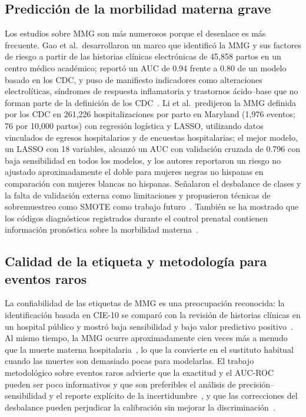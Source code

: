 \documentclass[healthcare,article,submit,pdftex,moreauthors]{Definitions/mdpi_es}
\begin{document}
\subsection{Predicción de la morbilidad materna grave}
Los estudios sobre MMG son más numerosos porque el desenlace es más frecuente. Gao et al.\
desarrollaron un marco que identificó la MMG y sus factores de riesgo a partir de las
historias clínicas electrónicas de 45{,}858 partos en un centro médico académico; reportó un
AUC de 0.94 frente a 0.80 de un modelo basado en los CDC, y puso de manifiesto indicadores
como alteraciones electrolíticas, síndromes de respuesta inflamatoria y trastornos
ácido--base que no forman parte de la definición de los CDC~\cite{Gao2019SMM}. Li et al.\
predijeron la MMG definida por los CDC en 261{,}226 hospitalizaciones por parto en Maryland
(1{,}976 eventos; 76 por 10{,}000 partos) con regresión logística y LASSO, utilizando datos
vinculados de egresos hospitalarios y de encuestas hospitalarias; el mejor modelo, un LASSO
con 18 variables, alcanzó un AUC con validación cruzada de 0.796 con baja sensibilidad en
todos los modelos, y los autores reportaron un riesgo no ajustado aproximadamente el doble
para mujeres negras no hispanas en comparación con mujeres blancas no hispanas. Señalaron
el desbalance de clases y la falta de validación externa como limitaciones y propusieron
técnicas de sobremuestreo como SMOTE como trabajo futuro~\cite{Li2025Maryland}.
También se ha mostrado que los códigos diagnósticos registrados durante el control
prenatal contienen información pronóstica sobre la morbilidad materna~\cite{Clapp2021Prenatal}.

\subsection{Calidad de la etiqueta y metodología para eventos raros}
La confiabilidad de las etiquetas de MMG es una preocupación reconocida: la identificación
basada en CIE-10 se comparó con la revisión de historias clínicas en un hospital público y
mostró baja sensibilidad y bajo valor predictivo positivo~\cite{Boulet2024ICD10SMM}. Al mismo
tiempo, la MMG ocurre aproximadamente cien veces más a menudo que la muerte materna
hospitalaria~\cite{Callaghan2012SMM}, lo que la convierte en el sustituto habitual cuando
las muertes son demasiado pocas para modelarlas. El trabajo metodológico sobre eventos raros
advierte que la exactitud y el AUC-ROC pueden ser poco informativos y que son preferibles el
análisis de precisión--sensibilidad y el reporte explícito de la incertidumbre~\cite{Marshall2023Imbalance,Saito2015PR},
y que las correcciones del desbalance pueden perjudicar la calibración sin mejorar la
discriminación~\cite{vandenGoorbergh2022Harm}.
\end{document}

